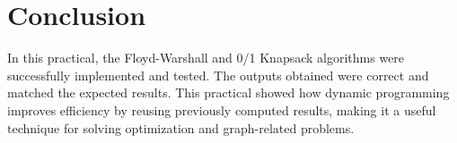 \documentclass{article}
\begin{document}
{\section*{Conclusion}

In this practical, the Floyd-Warshall and 0/1 Knapsack algorithms were successfully implemented and tested. The outputs obtained were correct and matched the expected results. This practical showed how dynamic programming improves efficiency by reusing previously computed results, making it a useful technique for solving optimization and graph-related problems.

}
\end{document}
